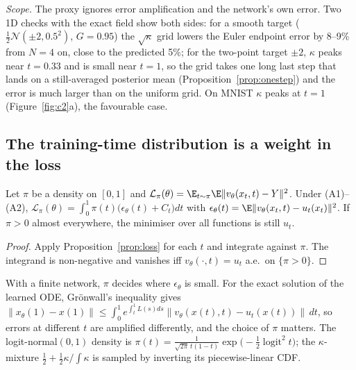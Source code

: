 \emph{Scope.} The proxy ignores error amplification and the network's own error. Two 1D checks with the exact field show both sides: for a smooth target ($\tfrac12\mathcal N(\pm2,0.5^2)$, $G=0.95$) the $\sqrt\kappa$ grid lowers the Euler endpoint error by 8--9\% from $N=4$ on, close to the predicted 5\%; for the two-point target $\pm2$, $\kappa$ peaks near $t=0.33$ and is small near $t=1$, so the grid takes one long last step that lands on a still-averaged posterior mean (Proposition~\ref{prop:onestep}) and the error is much larger than on the uniform grid. On MNIST $\kappa$ peaks at $t=1$ (Figure~\ref{fig:c2}a), the favourable case.

\subsection{The training-time distribution is a weight in the loss}\label{app:d6}
\begin{proposition}\label{prop:tdist}
Let $\pi$ be a density on $[0,1]$ and $\mathcal L_\pi(\theta)=\E_{t\sim\pi}\E\|v_\theta(x_t,t)-Y\|^2$. Under (A1)--(A2), $\mathcal L_\pi(\theta)=\int_0^1\pi(t)\big(\epsilon_\theta(t)+C_t\big)dt$ with $\epsilon_\theta(t)=\E\|v_\theta(x_t,t)-u_t(x_t)\|^2$. If $\pi>0$ almost everywhere, the minimiser over all functions is still $u_t$.
\end{proposition}
\begin{proof}
Apply Proposition~\ref{prop:loss} for each $t$ and integrate against $\pi$. The integrand is non-negative and vanishes iff $v_\theta(\cdot,t)=u_t$ a.e.\ on $\{\pi>0\}$.
\end{proof}
With a finite network, $\pi$ decides where $\epsilon_\theta$ is small. For the exact solution of the learned ODE, Gr\"onwall's inequality \citep[\S I.10]{hairer1993ode} gives $\|x_\theta(1)-x(1)\|\le\int_0^1e^{\int_t^1L(s)ds}\|v_\theta(x(t),t)-u_t(x(t))\|\,dt$, so errors at different $t$ are amplified differently, and the choice of $\pi$ matters. The logit-normal$(0,1)$ density is $\pi(t)=\frac{1}{\sqrt{2\pi}\,t(1-t)}\exp\!\big(-\tfrac12\operatorname{logit}^2t\big)$; the $\kappa$-mixture $\tfrac12+\tfrac12\kappa/\!\int\kappa$ is sampled by inverting its piecewise-linear CDF.

